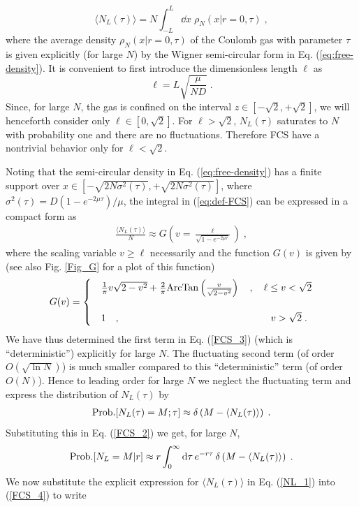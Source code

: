 \documentclass[onecolumn,superscriptaddress,
 amsmath,amssymb,
 aps,
 prd,
]{revtex4-1}
\newcommand{\bea}{\begin{eqnarray}}
\newcommand{\eea}{\end{eqnarray}}
\begin{document}
\begin{equation} \label{eq:def-FCS}
\langle N_L(\tau) \rangle = N \int_{-L}^{L} \dd x \; \rho_N(x | r = 0, \tau) \;,
\end{equation}
where the average density $\rho_N(x | r = 0, \tau)$ of the Coulomb gas with parameter $\tau$ is given explicitly (for large $N$) by the Wigner semi-circular form 
in Eq. (\ref{eq:free-density}). It is convenient to first introduce the dimensionless length $\ell$ as
\begin{equation}\label{eq:def-ell}
\ell = L \sqrt{\frac{\mu}{N D}} \;.
\end{equation}
Since, for large $N$, the gas is confined on the interval $z \in [-\sqrt{2},+\sqrt{2}]$, we will henceforth consider only $\ell \in [0, \sqrt{2}]$. For $\ell > \sqrt{2}$, $N_L(\tau)$ saturates to $N$ with probability one and there are no fluctuations. Therefore FCS have a nontrivial behavior only for $\ell < \sqrt{2}$. 


\vspace*{0.3cm}
Noting that the semi-circular density in Eq. (\ref{eq:free-density}) has a finite support over $x \in [-\sqrt{2N\sigma^2(\tau)}, + \sqrt{2N \sigma^2(\tau)}]$, where $\sigma^2(\tau) = D(1-e^{-2\mu \tau})/\mu$, the integral in (\ref{eq:def-FCS}) can be expressed in a compact form as
\bea \label{NL_1}
\frac{\langle N_L(\tau)\rangle}{N} \approx G\left( v = \frac{\ell}{\sqrt{1-e^{-2 \mu \tau}}}\right) \;,
\eea
where the scaling variable $v \geq \ell$ necessarily and the function $G(v)$ is given by (see also Fig. \ref{Fig_G} for a plot of this function)
\bea \label{def_G}
G(v) =
\begin{cases} 
&\frac{1}{\pi} v \sqrt{2-v^2} + \frac{2}{\pi} {\rm ArcTan}\left( \frac{v}{\sqrt{2-v^2}}\right) \quad, \quad \ell \leq v < \sqrt{2} \\
& \\
& 1 \quad, \quad \hspace*{5.1cm} v > \sqrt{2} \;.
\end{cases}
\eea
We have thus determined the first term in Eq. (\ref{FCS_3}) (which is ``deterministic'') explicitly for large $N$. The fluctuating second term (of order $O(\sqrt{\ln N})$) is much smaller compared to this ``deterministic'' term (of order $O(N)$). Hence to leading order for large $N$ we neglect the fluctuating term and express the distribution of $N_L(\tau)$ by
\bea \label{delta_NL}
{\rm Prob.}[N_L(\tau) = M ; \tau] \approx \delta\left( M - \langle N_L(\tau)\rangle \right) \;.
\eea
Substituting this in Eq. (\ref{FCS_2}) we get, for large $N$,
\bea \label{FCS_4}
{\rm Prob.}[N_L = M \vert r] \approx r\int_0^\infty \dd \tau  \,e^{-r \tau} \, \delta\left( M - \langle N_L(\tau)\rangle \right) \;.
\eea
We now substitute the explicit expression for $\langle N_L(\tau) \rangle$ in Eq. (\ref{NL_1}) into (\ref{FCS_4}) to write
\end{document}
